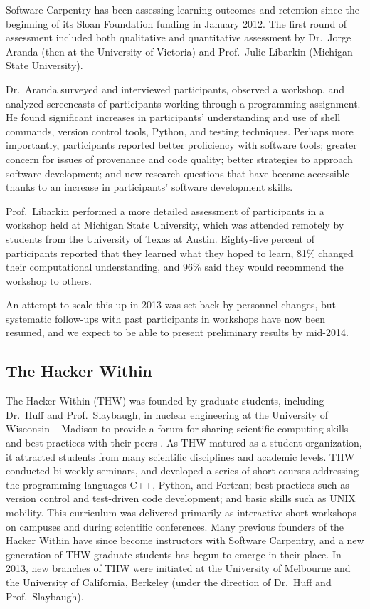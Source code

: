 \documentclass{proposalnsf}
\newlength{\up}
\begin{document}
Software Carpentry has been assessing learning outcomes and retention
since the beginning of its Sloan Foundation funding in January 2012.
The first round of assessment included both qualitative and
quantitative assessment by Dr.\ Jorge Aranda (then at the University
of Victoria) and Prof.\ Julie Libarkin (Michigan State University).

Dr.\ Aranda surveyed and interviewed participants, observed a
workshop, and analyzed screencasts of participants working through a
programming assignment. He found significant increases in
participants' understanding and use of shell commands, version control
tools, Python, and testing techniques. Perhaps more importantly,
participants reported better proficiency with software tools; greater
concern for issues of provenance and code quality; better strategies
to approach software development; and new research questions that have
become accessible thanks to an increase in participants' software
development skills.

Prof.\ Libarkin performed a more detailed assessment of participants
in a workshop held at Michigan State University, which was attended remotely by students from
the University of Texas at Austin. Eighty-five percent of participants
reported that they learned what they hoped to learn, 81\% changed
their computational understanding, and 96\% said they would recommend
the workshop to others.

An attempt to scale this up in 2013 was set back by personnel changes,
but systematic follow-ups with past participants in workshops have now
been resumed, and we expect to be able to present preliminary results
by mid-2014.

\subsection{The Hacker Within}
\label{sec:THW}

The Hacker Within (THW) was founded by graduate students, including Dr.\ Huff and Prof.\ Slaybaugh, in nuclear
engineering at the University of Wisconsin -- Madison to provide a
forum for sharing scientific computing skills and best practices with
their peers \cite{huff2011}. As THW matured as a student organization,
it attracted students from many scientific disciplines and academic
levels. THW conducted bi-weekly seminars, and developed a series of
short courses addressing the programming languages C++, Python, and
Fortran; best practices such as version control and test-driven code
development; and basic skills such as UNIX mobility. This curriculum
was delivered primarily as interactive short workshops on campuses and
during scientific conferences. Many previous founders of the Hacker
Within have since become instructors with Software Carpentry, and a
new generation of THW graduate students has begun to emerge in their
place. In 2013, new branches of THW were initiated at the University
of Melbourne and the University of California, Berkeley (under the direction of Dr.\ Huff and Prof.\ Slaybaugh).
\end{document}
